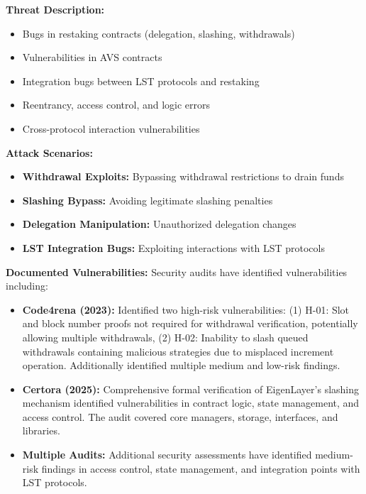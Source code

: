 \documentclass[runningheads]{llncs}
\begin{document}
\textbf{Threat Description:}
\begin{itemize}
    \item Bugs in restaking contracts (delegation, slashing, withdrawals)~\cite{certora2025,code4rena2023}
    \item Vulnerabilities in AVS contracts~\cite{zhang2024proof}
    \item Integration bugs between LST protocols and restaking~\cite{li2024mitigating}
    \item Reentrancy, access control, and logic errors~\cite{rodler2018sereum,zhang2020smart}
    \item Cross-protocol interaction vulnerabilities~\cite{chen2021sok}
\end{itemize}

\textbf{Attack Scenarios:}
\begin{itemize}
    \item \textbf{Withdrawal Exploits:} Bypassing withdrawal restrictions to drain funds
    \item \textbf{Slashing Bypass:} Avoiding legitimate slashing penalties
    \item \textbf{Delegation Manipulation:} Unauthorized delegation changes
    \item \textbf{LST Integration Bugs:} Exploiting interactions with LST protocols
\end{itemize}

\textbf{Documented Vulnerabilities:}
Security audits have identified vulnerabilities including:
\begin{itemize}
    \item \textbf{Code4rena (2023):} Identified two high-risk vulnerabilities: (1) H-01: Slot and block number proofs not required for withdrawal verification, potentially allowing multiple withdrawals, (2) H-02: Inability to slash queued withdrawals containing malicious strategies due to misplaced increment operation. Additionally identified multiple medium and low-risk findings.
    \item \textbf{Certora (2025):} Comprehensive formal verification of EigenLayer's slashing mechanism identified vulnerabilities in contract logic, state management, and access control. The audit covered core managers, storage, interfaces, and libraries.
    \item \textbf{Multiple Audits:} Additional security assessments have identified medium-risk findings in access control, state management, and integration points with LST protocols.
\end{itemize}
\end{document}
